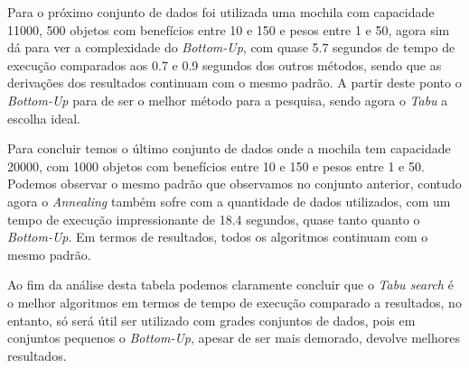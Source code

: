 Para o próximo conjunto de dados foi utilizada uma mochila com capacidade 11000, 500 objetos com benefícios entre 10 e 150 e pesos entre 1 e 50, agora sim dá para ver a complexidade do \textit{Bottom-Up}, com quase 5.7 segundos de tempo de execução comparados aos 0.7 e 0.9 segundos dos outros métodos, sendo que as derivações dos resultados continuam com o mesmo padrão. A partir deste ponto o \textit{Bottom-Up} para de ser o melhor método para a pesquisa, sendo agora o \textit{Tabu} a escolha ideal.


Para concluir temos o último conjunto de dados onde a mochila tem capacidade 20000, com 1000 objetos com benefícios entre 10 e 150 e pesos entre 1 e 50. Podemos observar o mesmo padrão que observamos no conjunto anterior, contudo agora o \textit{Annealing} também sofre com a quantidade de dados utilizados, com um tempo de execução impressionante de 18.4 segundos, quase tanto quanto o \textit{Bottom-Up}. Em termos de resultados, todos os algoritmos continuam com o mesmo padrão.

Ao fim da análise desta tabela podemos claramente concluir que o \textit{Tabu search} é o melhor algoritmos em termos de tempo de execução comparado a resultados, no entanto, só será útil ser utilizado com grades conjuntos de dados, pois em conjuntos pequenos o \textit{Bottom-Up}, apesar de ser mais demorado, devolve melhores resultados.